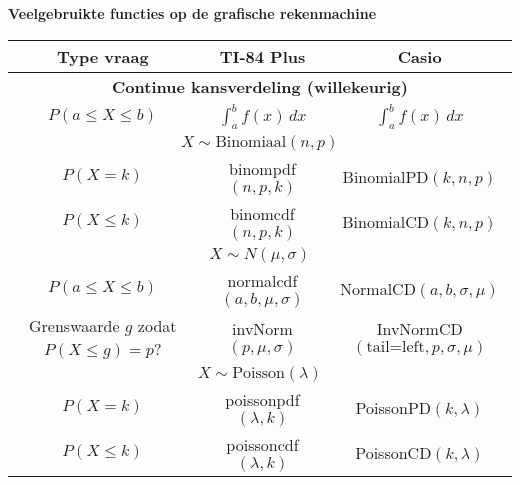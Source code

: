 \documentclass[11pt,a4paper,dutch]{article} %
\begin{document}
\textbf{Veelgebruikte functies op de grafische rekenmachine}
\begin{table}[H]
    \centering
    \begin{tabular}{c|c|c}
        \toprule
            \textbf{Type vraag}                     & \textbf{TI-84 Plus}           & \textbf{Casio} \\
        \midrule
            \multicolumn{3}{c}{\textbf{Continue kansverdeling (willekeurig)}} \\ 
        \midrule
            $P(a \le X \le b)$                      & $\int_{a}^{b} f(x)\, dx$      & $\int_{a}^{b} f(x)\, dx$\\
        \midrule    
            \multicolumn{3}{c}{\textbf{$X \sim \text{Binomiaal}(n, p)$}} \\ 
        \midrule
            $P(X = k)$                              & binompdf$(n,p,k)$             & BinomialPD$(k, n, p)$ \\
            $P(X \le k)$                            & binomcdf$(n,p,k)$             & BinomialCD$(k, n, p)$ \\
        \midrule    
            \multicolumn{3}{c}{\textbf{$X \sim N(\mu, \sigma)$}} \\
        \midrule 
            $P(a \le X \le b)$                      & normalcdf$(a,b,\mu,\sigma)$   & NormalCD$(a, b, \sigma, \mu)$ \\
            Grenswaarde $g$ zodat $P(X \le g)=p$?   & invNorm$(p,\mu,\sigma)$       & InvNormCD$(\text{tail=left}, p, \sigma, \mu)$ \\
        \midrule 
            \multicolumn{3}{c}{\textbf{$X \sim \text{Poisson}(\lambda)$}} \\  
        \midrule
            $P(X = k)$                              & poissonpdf$(\lambda, k)$      & PoissonPD$(k, \lambda)$ \\
            $P(X \le k)$                            & poissoncdf$(\lambda, k)$      & PoissonCD$(k, \lambda)$ \\
        \bottomrule
    \end{tabular}
\end{table}
\end{document}
